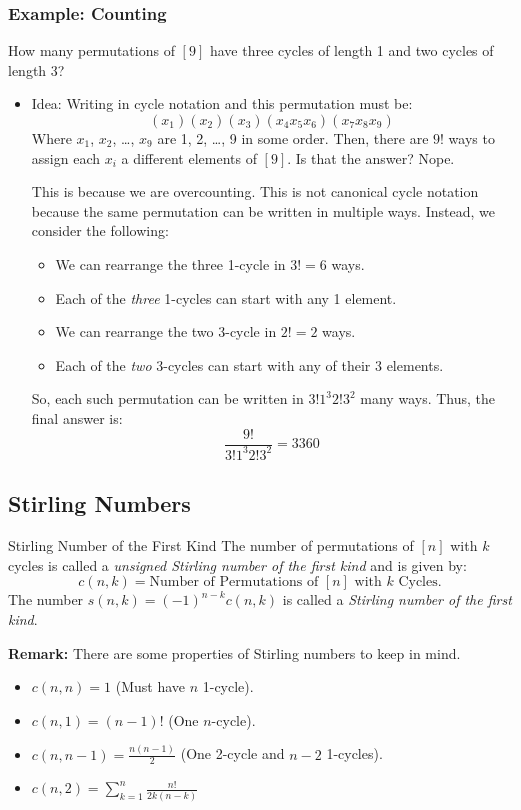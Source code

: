 \documentclass[letterpaper]{article}
\begin{document}
\subsubsection{Example: Counting}
How many permutations of $[9]$ have three cycles of length 1 and two cycles of length 3?
\begin{itemize}
    \item Idea: Writing in cycle notation and this permutation must be:
    \[(x_1)(x_2)(x_3)(x_4 x_5 x_6)(x_7 x_8 x_9)\]
    Where $x_1$, $x_2$, \dots, $x_9$ are 1, 2, \dots, 9 in some order. Then, there are $9!$ ways to assign each $x_i$ a different elements of $[9]$. Is that the answer? Nope.

    \bigskip 
    
    This is because we are overcounting. This is not canonical cycle notation because the same permutation can be written in multiple ways. Instead, we consider the following:
    \begin{itemize}
        \item We can rearrange the three 1-cycle in $3! = 6$ ways.
        \item Each of the \emph{three} 1-cycles can start with any 1 element.
        \item We can rearrange the two 3-cycle in $2! = 2$ ways. 
        \item Each of the \emph{two} 3-cycles can start with any of their 3 elements. 
    \end{itemize}
    So, each such permutation can be written in $3!1^3 2!3^2$ many ways. Thus, the final answer is:
    \[\frac{9!}{3!1^3 2!3^2} = 3360\] 
\end{itemize}

\subsection{Stirling Numbers}
\begin{definition}{Stirling Number of the First Kind}{}
    The number of permutations of $[n]$ with $k$ cycles is called a \emph{unsigned Stirling number of the first kind} and is given by:
    \[c(n, k) = \text{Number of Permutations of } [n] \text{ with } k \text{ Cycles.}\]
    The number $s(n, k) = (-1)^{n - k} c(n, k)$ is called a \emph{Stirling number of the first kind}. 
\end{definition}
\textbf{Remark:} There are some properties of Stirling numbers to keep in mind.
\begin{itemize}
    \item $c(n, n) = 1$ (Must have $n$ 1-cycle).
    \item $c(n, 1) = (n - 1)!$ (One $n$-cycle).
    \item $c(n, n - 1) = \frac{n(n - 1)}{2}$ (One 2-cycle and $n - 2$ 1-cycles).
    \item $c(n, 2) = \sum_{k = 1}^{n} \frac{n!}{2k(n - k)}$
\end{itemize}
\end{document}
